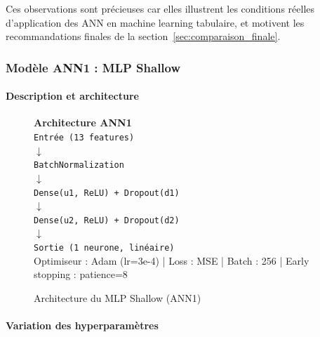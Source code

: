 \documentclass[12pt,a4paper]{article}
\begin{document}
Ces observations sont précieuses car elles illustrent les conditions réelles
d'application des ANN en machine learning tabulaire, et motivent les recommandations
finales de la section~\ref{sec:comparaison_finale}.

\subsubsection{Modèle ANN1 : MLP Shallow}


\paragraph{Description et architecture}

\begin{figure}[H]
\centering
\begin{tcolorbox}[colback=lightgray,colframe=maincolor,width=0.85\textwidth,arc=2mm,boxrule=0.8pt]
\centering
\textbf{Architecture ANN1}\\[0.3cm]
\texttt{Entrée (13 features)}\\
$\downarrow$\\
\texttt{BatchNormalization}\\
$\downarrow$\\
\texttt{Dense(u1, ReLU) + Dropout(d1)}\\
$\downarrow$\\
\texttt{Dense(u2, ReLU) + Dropout(d2)}\\
$\downarrow$\\
\texttt{Sortie (1 neurone, linéaire)}\\[0.2cm]
\small Optimiseur : Adam (lr=3e-4) | Loss : MSE | Batch : 256 | Early stopping : patience=8
\end{tcolorbox}
\caption{Architecture du MLP Shallow (ANN1)}
\end{figure}

\paragraph{Variation des hyperparamètres}
\end{document}
